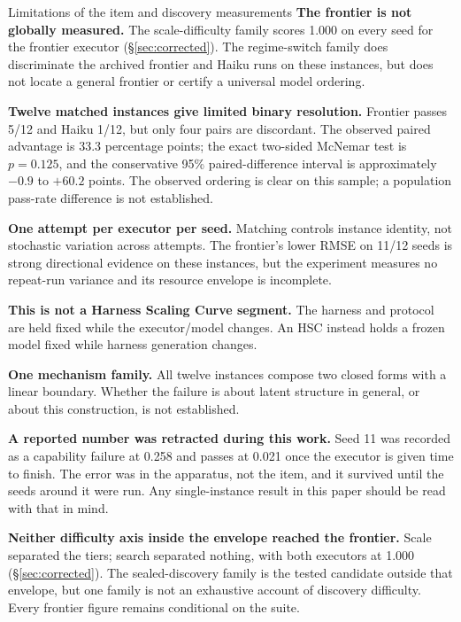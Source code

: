 \documentclass[11pt]{article}
\theoremstyle{definition}
\begin{document}
\begin{cautionbox}{Limitations of the item and discovery measurements}
\textbf{The frontier is not globally measured.} The scale-difficulty family scores 1.000 on every seed for the frontier executor (\S\ref{sec:corrected}). The regime-switch family does discriminate the archived frontier and Haiku runs on these instances, but does not locate a general frontier or certify a universal model ordering.

\textbf{Twelve matched instances give limited binary resolution.} Frontier passes 5/12 and Haiku 1/12, but only four pairs are discordant. The observed paired advantage is 33.3 percentage points; the exact two-sided McNemar test is $p=0.125$, and the conservative 95\% paired-difference interval is approximately $-0.9$ to $+60.2$ points. The observed ordering is clear on this sample; a population pass-rate difference is not established.

\textbf{One attempt per executor per seed.} Matching controls instance identity, not stochastic variation across attempts. The frontier's lower RMSE on 11/12 seeds is strong directional evidence on these instances, but the experiment measures no repeat-run variance and its resource envelope is incomplete.

\textbf{This is not a Harness Scaling Curve segment.} The harness and protocol are held fixed while the executor/model changes. An HSC instead holds a frozen model fixed while harness generation changes.

\textbf{One mechanism family.} All twelve instances compose two closed forms with a linear boundary. Whether the failure is about latent structure in general, or about this construction, is not established.

\textbf{A reported number was retracted during this work.} Seed 11 was recorded as a capability failure at 0.258 and passes at 0.021 once the executor is given time to finish. The error was in the apparatus, not the item, and it survived until the seeds around it were run. Any single-instance result in this paper should be read with that in mind.

\textbf{Neither difficulty axis inside the envelope reached the frontier.} Scale separated the tiers; search separated nothing, with both executors at 1.000 (\S\ref{sec:corrected}). The sealed-discovery family is the tested candidate outside that envelope, but one family is not an exhaustive account of discovery difficulty. Every frontier figure remains conditional on the suite.


\end{cautionbox}
\end{document}
